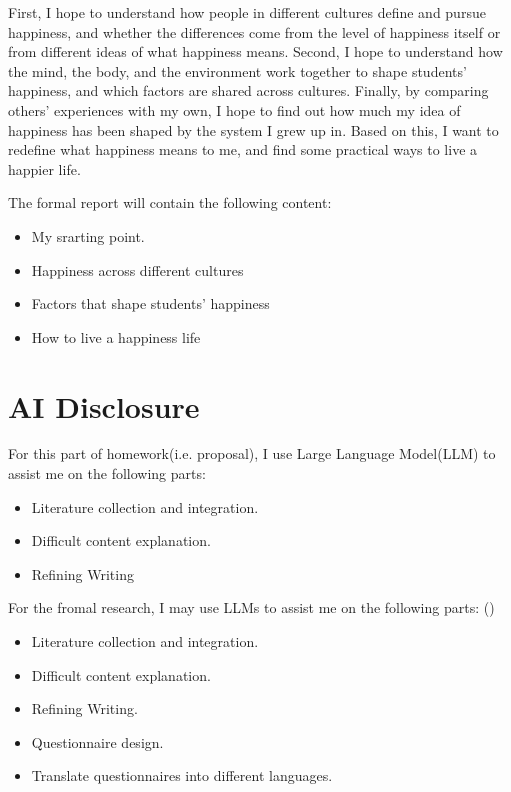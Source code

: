 \documentclass[12pt,a4paper]{article}
\begin{document}
First, I hope to understand how people in different cultures define and
pursue happiness, and whether the differences come from the level of
happiness itself or from different ideas of what happiness means.
Second, I hope to understand how the mind, the body, and the environment
work together to shape students' happiness, and which factors are shared
across cultures.
Finally, by comparing others' experiences with my own, I hope to find
out how much my idea of happiness has been shaped by the system I grew up
in. Based on this, I want to redefine what happiness means to me, and
find some practical ways to live a happier life.

The formal report will contain the following content:
\begin{itemize}
  \item My srarting point.
  \item Happiness across different cultures
  \item Factors that shape students' happiness
  \item How to live a happiness life
\end{itemize}


\section{AI Disclosure}

For this part of homework(i.e. proposal), I use Large Language Model(LLM) to assist me on the following parts:

\begin{itemize}
  \item Literature collection and integration.
  \item Difficult content explanation.
  \item Refining Writing
\end{itemize}

For the fromal research, I may use LLMs to assist me on the following parts: ()

\begin{itemize}
  \item Literature collection and integration.
  \item Difficult content explanation.
  \item Refining Writing.
  \item Questionnaire design.
  \item Translate questionnaires into different languages.
\end{itemize}

\printbibliography
\end{document}
